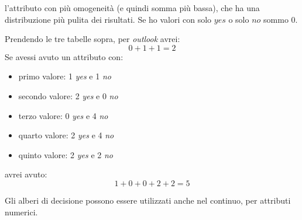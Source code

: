 \documentclass[a4paper,12pt, oneside]{book}
\begin{document}
l'attributo con più omogeneità (e quindi somma più bassa), che ha una
distribuzione più pulita dei risultati. Se ho valori con solo
$yes$ o solo $no$ sommo 0.
\begin{esempio}
  Prendendo le tre tabelle sopra, per \textit{outlook} avrei:
  \[0+1+1=2\]
  Se avessi avuto un attributo con:
  \begin{itemize}
    \item primo valore: 1 \textit{yes} e 1 \textit{no}
    \item secondo valore: 2 \textit{yes} e 0 \textit{no}
    \item terzo valore: 0 \textit{yes} e 4 \textit{no}
    \item quarto valore: 2 \textit{yes} e 4 \textit{no}
    \item quinto valore: 2 \textit{yes} e 2 \textit{no} 
  \end{itemize}
  avrei avuto:
  \[1+0+0+2+2=5\]
\end{esempio}
Gli alberi di decisione possono essere utilizzati anche nel continuo, per
attributi numerici.
\end{document}
